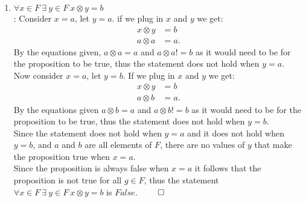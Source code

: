 \documentclass[11pt,twoside]{amsart}
\theoremstyle{definition}
\begin{document}
\begin{enumerate}[label= 2.\arabic*, itemsep=0.4cm]
        \item %
          $\forall x \in F \ \exists \ y \in F \ x \otimes y = b $ \medskip \\
           : Consider $x=a$, let $y = a$. if we plug in $x$ and $y$ we get:
          \begin{align*}
            x \otimes y &= b \\
            a \otimes a &= a.
          \end{align*}
          By the equations given, $a \otimes a = a$ and  $a \otimes a != b$ as it would need to be for the proposition to be true, thus the statement does not hold when $y = a$.\\
          Now consider $x=a$, let $y=b$. If we plug in $x$ and $y$ we get:
        \begin{align*}
          x \otimes y &= b \\
          a \otimes b &= a.
        \end{align*}
        By the equations given $a \otimes b = a$ and  $a \otimes b != b$ as it would need to be for the proposition to be true, thus the statement does not hold when $y = b$.\medskip \\
        Since the statement does not hold when $y=a$ and it does not hold when $y=b$, and $a$ and $b$ are all elements of $F$, there are no values of $y$ that make the proposition true when $x=a$.\medskip \\
       Since the proposition is always false when $x=a$ it follows that the proposition is not true for all $g \in F$, thus the statement $\forall x \in F \ \exists \ y \in F \ x \otimes y = b $ is $False$. $\qed$ 
       \newpage


\end{enumerate}
\end{document}

